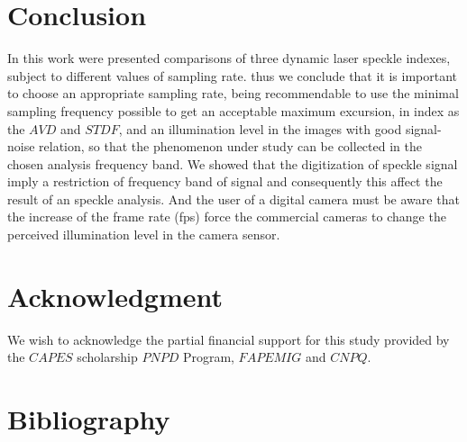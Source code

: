 \documentclass[review]{elsarticle}
\begin{document}
\section{Conclusion} 

In this work were presented comparisons of three dynamic laser speckle indexes,
subject to different values of sampling rate.
thus we conclude that it is important to choose an appropriate sampling rate, 
being recommendable to use the minimal sampling frequency possible to get an acceptable maximum excursion, 
in index as the $AVD$ and $STDF$,
and an illumination level in the images with good signal-noise relation,
so that the phenomenon under study can be collected in the chosen analysis frequency band.
We showed that the digitization  of speckle signal imply a restriction of frequency 
band of signal and consequently this affect the result of an speckle analysis.
And the user of a digital camera must be aware that the increase of the frame rate (fps) 
force the commercial cameras to change the perceived illumination level in the camera sensor.

\section{Acknowledgment}
We wish to acknowledge the partial financial support for this study provided by the $CAPES$ 
scholarship
$PNPD$ Program, $FAPEMIG$ and $CNPQ$.


\section{Bibliography}
\end{document}
